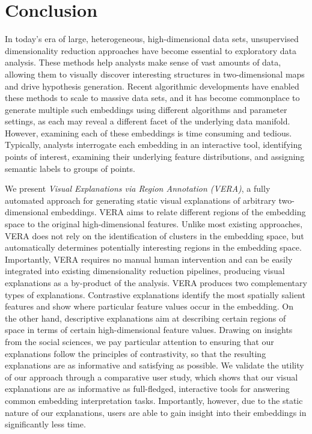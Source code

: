 \documentclass[lettersize,journal]{IEEEtran}
\begin{document}
\section{Conclusion}

In today's era of large, heterogeneous, high-dimensional data sets, unsupervised dimensionality reduction approaches have become essential to exploratory data analysis. These methods help analysts make sense of vast amounts of data, allowing them to visually discover interesting structures in two-dimensional maps and drive hypothesis generation. Recent algorithmic developments have enabled these methods to scale to massive data sets, and it has become commonplace to generate multiple such embeddings using different algorithms and parameter settings, as each may reveal a different facet of the underlying data manifold. However, examining each of these embeddings is time consuming and tedious. Typically, analysts interrogate each embedding in an interactive tool, identifying points of interest, examining their underlying feature distributions, and assigning semantic labels to groups of points.

We present \textit{Visual Explanations via Region Annotation (VERA)}, a fully automated approach for generating static visual explanations of arbitrary two-dimensional embeddings. VERA aims to relate different regions of the embedding space to the original high-dimensional features. Unlike most existing approaches, VERA does not rely on the identification of clusters in the embedding space, but automatically determines potentially interesting regions in the embedding space. Importantly, VERA requires no manual human intervention and can be easily integrated into existing dimensionality reduction pipelines, producing visual explanations as a by-product of the analysis.
VERA produces two complementary types of explanations.
Contrastive explanations identify the most spatially salient features and show where particular feature values occur in the embedding.
On the other hand, descriptive explanations aim at describing certain regions of space in terms of certain high-dimensional feature values.
Drawing on insights from the social sciences, we pay particular attention to ensuring that our explanations follow the principles of contrastivity, so that the resulting explanations are as informative and satisfying as possible.
We validate the utility of our approach through a comparative user study, which shows that our visual explanations are as informative as full-fledged, interactive tools for answering common embedding interpretation tasks. Importantly, however, due to the static nature of our explanations, users are able to gain insight into their embeddings in significantly less time.
\end{document}
